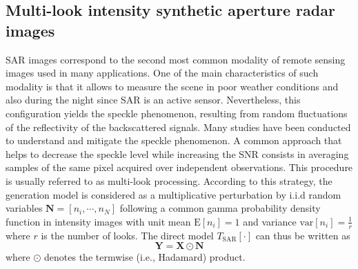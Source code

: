 \documentclass[review]{elsarticle}
\begin{document}
\begin{appendix}
\subsection{Multi-look intensity synthetic aperture radar images}

SAR images correspond to the second most common modality of remote sensing images used in many applications. One of the main characteristics of such modality is that it allows to measure the scene in poor weather conditions and also during the night since SAR is an active sensor. Nevertheless, this configuration yields the speckle phenomenon, resulting from random fluctuations of the reflectivity of the backscattered signals. Many studies have been conducted to understand and mitigate the speckle phenomenon. A common approach that helps to decrease the speckle level while increasing the SNR consists in averaging samples of the same pixel acquired over independent observations. This procedure is usually referred to as multi-look processing. According to this strategy, the generation model is considered as a multiplicative perturbation by i.i.d random variables $\mathbf{N} = [n_i,\cdots,n_{N}]$ following a common gamma probability density function in intensity images with unit mean $\mathrm{E}[n_i] = 1$ and variance $\mathrm{var}[n_i] = \frac{1}{r}$ where $r$ is the number of looks. The direct model $\mathit{T}_{\mathrm{SAR}}[\cdot]$ can thus be written as
\begin{equation}
	\mathbf{Y} = \mathbf{X} \odot \mathbf{N}
\end{equation}
where $\odot$ denotes the termwise (i.e., Hadamard) product.


\end{appendix}
\end{document}
